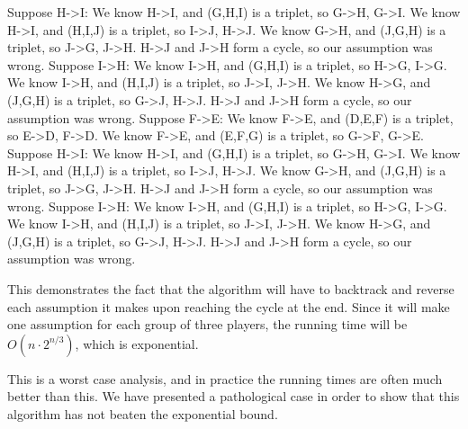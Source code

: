 \documentclass[12pt,x11names, rgb]{article}
\begin{document}
\begin{verbatimtab}
        Suppose H->I:
            We know H->I, and (G,H,I) is a triplet, so G->H, G->I.
            We know H->I, and (H,I,J) is a triplet, so I->J, H->J.
            We know G->H, and (J,G,H) is a triplet, so J->G, J->H.
            H->J and J->H form a cycle, so our assumption was wrong.
        Suppose I->H:
            We know I->H, and (G,H,I) is a triplet, so H->G, I->G.
            We know I->H, and (H,I,J) is a triplet, so J->I, J->H.
            We know H->G, and (J,G,H) is a triplet, so G->J, H->J.
            H->J and J->H form a cycle, so our assumption was wrong.
    Suppose F->E:
        We know F->E, and (D,E,F) is a triplet, so E->D, F->D.
        We know F->E, and (E,F,G) is a triplet, so G->F, G->E.
        Suppose H->I:
            We know H->I, and (G,H,I) is a triplet, so G->H, G->I.
            We know H->I, and (H,I,J) is a triplet, so I->J, H->J.
            We know G->H, and (J,G,H) is a triplet, so J->G, J->H.
            H->J and J->H form a cycle, so our assumption was wrong.
        Suppose I->H:
            We know I->H, and (G,H,I) is a triplet, so H->G, I->G.
            We know I->H, and (H,I,J) is a triplet, so J->I, J->H.
            We know H->G, and (J,G,H) is a triplet, so G->J, H->J.
            H->J and J->H form a cycle, so our assumption was wrong.
    \end{verbatimtab}

    This demonstrates the fact that the algorithm will have to backtrack and reverse each assumption it makes upon reaching the cycle at the end. Since it will make one assumption for each group of three players, the running time will be $O(n \cdot 2^{n/3})$, which is exponential. 

    This is a worst case analysis, and in practice the running times are often much better than this. We have presented a pathological case in order to show that this algorithm has not beaten the exponential bound.

\begin{comment}
\section{Overview: Steiner Triple Systems}
    Definition, examples
    discuss how the number of pairs dominates the number of players
    (this defeats our heuristic)
    A slightly better algorithm could `outsmart' our trap from the previous section, but the existence of Steiner Triple Systems shows that we can have so few repeated pairs as to render the heuristic useless. STS shows that this is a systemic problem. 
\end{comment}
\end{document}
